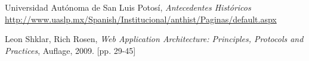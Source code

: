 \begin{thebibliography}{9}

Universidad Autónoma de San Luis Potosí, {\it Antecedentes Históricos} \\
{\url{http://www.uaslp.mx/Spanish/Institucional/anthist/Paginas/default.aspx}}

Leon Shklar, Rich Rosen, {\it Web Application Architecture: Principles, Protocols and Practices}, Auflage, 2009. [pp. 29-45]


\end{thebibliography}
